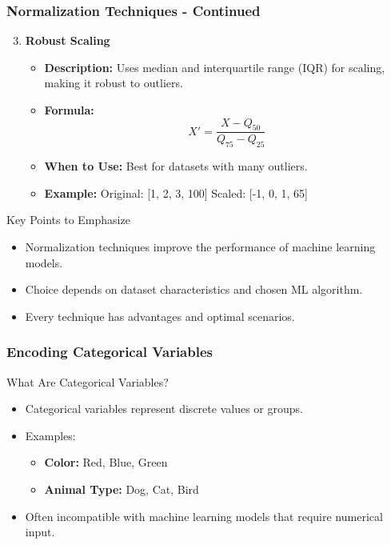 \documentclass[aspectratio=169]{beamer}
\begin{document}
\begin{frame}[fragile]
    \frametitle{Normalization Techniques - Continued}
    \begin{enumerate}
        \setcounter{enumi}{2}
        \item \textbf{Robust Scaling}
        \begin{itemize}
            \item \textbf{Description:} Uses median and interquartile range (IQR) for scaling, making it robust to outliers.
            \item \textbf{Formula:} 
            \begin{equation}
            X' = \frac{X - Q_{50}}{Q_{75} - Q_{25}}
            \end{equation}
            \item \textbf{When to Use:} Best for datasets with many outliers.
            \item \textbf{Example:} 
                Original: [1, 2, 3, 100]
                Scaled: [-1, 0, 1, 65]
        \end{itemize}
    \end{enumerate}

    \begin{block}{Key Points to Emphasize}
        \begin{itemize}
            \item Normalization techniques improve the performance of machine learning models.
            \item Choice depends on dataset characteristics and chosen ML algorithm.
            \item Every technique has advantages and optimal scenarios.
        \end{itemize}
    \end{block}
\end{frame}

\begin{frame}[fragile]
    \frametitle{Encoding Categorical Variables}
    \begin{block}{What Are Categorical Variables?}
        \begin{itemize}
            \item Categorical variables represent discrete values or groups.
            \item Examples: 
            \begin{itemize}
                \item \textbf{Color:} Red, Blue, Green
                \item \textbf{Animal Type:} Dog, Cat, Bird
            \end{itemize}
            \item Often incompatible with machine learning models that require numerical input.
        \end{itemize}
    \end{block}
\end{frame}
\end{document}
